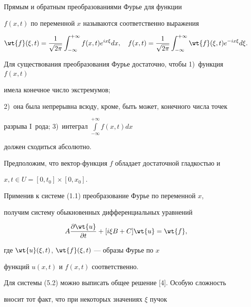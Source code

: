 \begin{defns}


Прямым и обратным преобразованиями Фурье для функции


$f(x,t)$ по переменной $x$ называются соответственно выражения


$$


\wt{f}(\xi,t)=\frac{1}{\sqrt{2\pi}}\int_{-\infty}^{+\infty}


f(x,t)e^{ix\xi}dx,\quad


f(x,t)=\frac{1}{\sqrt{2\pi}}\int_{-\infty}^{+\infty}


\wt{f}(\xi,t)e^{-ix\xi}d\xi.


$$


Для существования преобразования Фурье достаточно, чтобы 1)~функция $f(x,t)$


имела конечное число экстремумов;


2)~она была непрерывна всюду, кроме, быть может, конечного числа точек


разрыва I~рода; 3)~интеграл $\int\limits_{-\infty}^{+\infty}f(x,t)dx$


должен сходиться абсолютно.


\end{defns}





Предположим, что вектор-функция $f$ обладает достаточной гладкостью и


$x,t \in U=[0,t_0]\times[0,x_0]$.





Применив к системе (1.1) преобразование Фурье по переменной $x$,


получим систему обыкновенных дифференциальных уравнений


\begin{equation}


A\frac{\partial\wt{u}}{\partial{t}}+[i\xi B+C]\wt{u} =\wt {f},


\end{equation}


где $\wt{u}(\xi,t)$, $\wt{f}(\xi,t)$ --- образы Фурье по $x$


функций $u(x,t)$ и $f(x,t)$ соответственно.





Для системы (5.2) можно выписать общее решение [4]. Особую сложность


вносит тот факт, что при некоторых значениях $\xi $ пучок


